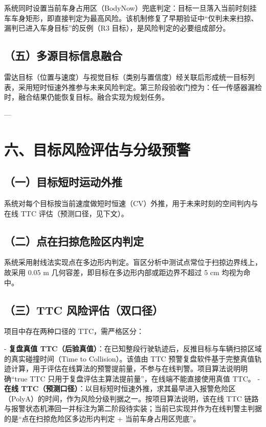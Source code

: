 \documentclass[UTF8,11pt]{ctexart}
\begin{document}
系统同时设置当前车身占用区（BodyNow）兜底判定：目标一旦落入当前时刻挂车车身矩形，即直接判定为最高风险。该机制修复了早期验证中“仅判未来扫掠、漏判已进入车身目标”的反例（R3 目标），是风险判定的必要组成部分。

\subsection*{（五）多源目标信息融合}
雷达目标（位置与速度）与视觉目标（类别与置信度）经关联后形成统一目标列表，采用短时恒速外推参与未来风险判定。第三阶段验收门控为：任一传感器漏检时，融合结果仍能恢复目标。融合实现为规划任务。

---

\section*{六、目标风险评估与分级预警}
\subsection*{（一）目标短时运动外推}
系统对每个目标按当前速度做短时恒速（CV）外推，用于未来时刻的空间判内与在线 TTC 评估（预测口径，见下文）。

\subsection*{（二）点在扫掠危险区内判定}
系统采用射线法实现点在多边形内判定。盲区分析中测试点常位于扫掠边界线上，故采用 0.05 m 几何容差，即目标在多边形内部或距边界不超过 5 cm 均视为命中。

\subsection*{（三）TTC 风险评估（双口径）}
项目中存在两种口径的 TTC，需严格区分：

- \textbf{复盘真值 TTC（后验真值）}：在已知整段行驶轨迹后，反推目标与车辆扫掠区域的真实碰撞时间（Time to Collision）。该值由 TTC 预警复盘软件基于完整真值轨迹计算，用于评估在线算法的预警提前量，不参与在线判警。项目算法说明明确“true TTC 只用于复盘评估主算法提前量”，在线端不能直接使用真值 TTC。 - \textbf{在线 TTC（预测口径）}：以目标短时恒速外推，求其最早进入报警危险区（PolyA）的时间，作为风险分级判据之一。按项目算法说明，该在线 TTC 链路与报警状态机滞回一并标注为第二阶段待实装；当前已实现并作为在线判警主判据的是“点在扫掠危险区多边形内判定 + 当前车身占用区兜底”。
\end{document}
